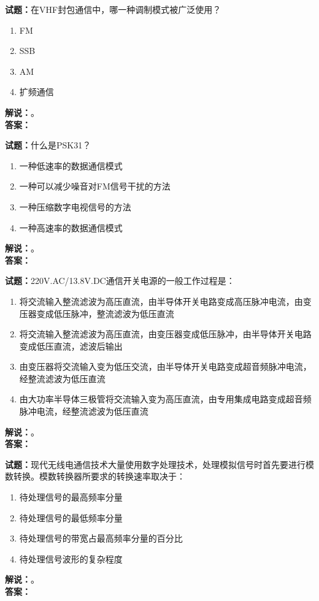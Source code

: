 \documentclass{ctexbook}
\begin{document}
\vspace{\baselineskip}

\noindent\textbf{试题：}在VHF封包通信中，哪一种调制模式被广泛使用？
\begin{enumerate}[leftmargin=3em]
  \item FM
  \item SSB
  \item AM
  \item 扩频通信
\end{enumerate}
\noindent\textbf{解说：}\textbf{}。\\\noindent\textbf{答案：}

\vspace{\baselineskip}

\noindent\textbf{试题：}什么是PSK31？
\begin{enumerate}[leftmargin=3em]
  \item 一种低速率的数据通信模式
  \item 一种可以减少噪音对FM信号干扰的方法
  \item 一种压缩数字电视信号的方法
  \item 一种高速率的数据通信模式
\end{enumerate}
\noindent\textbf{解说：}\textbf{}。\\\noindent\textbf{答案：}

\vspace{\baselineskip}

\noindent\textbf{试题：}220V.AC/13.8V.DC通信开关电源的一般工作过程是：
\begin{enumerate}[leftmargin=3em]
  \item 将交流输入整流滤波为高压直流，由半导体开关电路变成高压脉冲电流，由变压器变成低压脉冲，整流滤波为低压直流
  \item 将交流输入整流滤波为高压直流，由变压器变成低压脉冲，由半导体开关电路变成低压直流，滤波后输出
  \item 由变压器将交流输入变为低压交流，由半导体开关电路变成超音频脉冲电流，经整流滤波为低压直流
  \item 由大功率半导体三极管将交流输入变为高压直流，由专用集成电路变成超音频脉冲电流，经整流滤波为低压直流
\end{enumerate}
\noindent\textbf{解说：}\textbf{}。\\\noindent\textbf{答案：}

\vspace{\baselineskip}

\noindent\textbf{试题：}现代无线电通信技术大量使用数字处理技术，处理模拟信号时首先要进行模数转换。模数转换器所要求的转换速率取决于：
\begin{enumerate}[leftmargin=3em]
  \item 待处理信号的最高频率分量
  \item 待处理信号的最低频率分量
  \item 待处理信号的带宽占最高频率分量的百分比
  \item 待处理信号波形的复杂程度
\end{enumerate}
\noindent\textbf{解说：}\textbf{}。\\\noindent\textbf{答案：}
\end{document}
